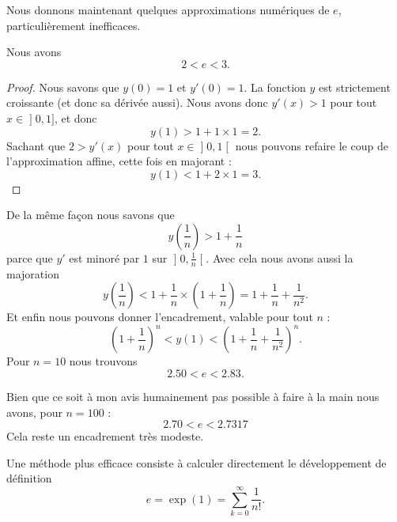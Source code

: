 Nous donnons maintenant quelques approximations numériques de \( e\), particulièrement inefficaces.

\begin{lemma}
	Nous avons
	\begin{equation}
		2<e<3.
	\end{equation}
\end{lemma}

\begin{proof}
	Nous savons que \( y(0)=1\) et \( y'(0)=1\). La fonction \( y\) est strictement croissante (et donc sa dérivée aussi). Nous avons donc \( y'(x)>1\) pour tout \( x\in\mathopen] 0 , 1 \mathclose]\), et donc
	\begin{equation}
		y(1)>1+1\times 1=2.
	\end{equation}
	Sachant que \( 2>y'(x)\) pour tout \( x\in \mathopen] 0 , 1 \mathclose[\) nous pouvons refaire le coup de l'approximation affine, cette fois en majorant :
	\begin{equation}
		y(1)<1+2\times 1=3.
	\end{equation}
\end{proof}

De la même façon nous savons que
\begin{equation}
	y(\frac{1}{ n })>1+\frac{1}{ n }
\end{equation}
parce que \( y'\) est minoré par \( 1\) sur \( \mathopen] 0 , \frac{1}{ n } \mathclose[\). Avec cela nous avons aussi la majoration
	\begin{equation}
		y(\frac{1}{ n })<1+\frac{1}{ n }\times \left( 1+\frac{1}{ n } \right)=1+\frac{1}{ n }+\frac{1}{ n^2 }.
	\end{equation}
	Et enfin nous pouvons donner l'encadrement, valable pour tout \( n\) :
	\begin{equation}
		\left( 1+\frac{1}{ n } \right)^n<y(1)<\left( 1+\frac{1}{ n }+\frac{1}{ n^2 } \right)^n.
	\end{equation}
	Pour \( n=10\) nous trouvons
	\begin{equation}
		2.50<e<2.83.
	\end{equation}

	Bien que ce soit à mon avis humainement pas possible à faire à la main nous avons, pour \( n=100\) :
	\begin{equation}
		2.70<e<2.7317
	\end{equation}
	Cela reste un encadrement très modeste.

	Une méthode plus efficace consiste à calculer directement le développement de définition
	\begin{equation}
		e=\exp(1)=\sum_{k=0}^{\infty}\frac{1}{ n! }.
	\end{equation}
	

